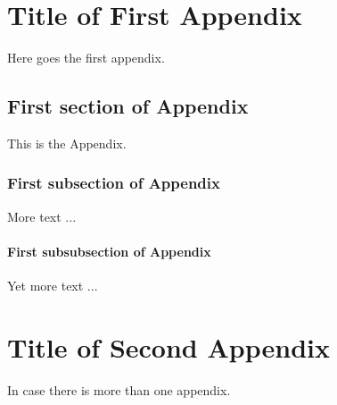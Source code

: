 \documentclass[12pt]{nuthesis}	%
\begin{document}
% 


\appendix		%


\chapter{Title of First Appendix} 	%

Here goes the first appendix.


\section{First section of Appendix}	%

This is the Appendix.

\subsection{First subsection of Appendix}  %

More text ...

\subsubsection{First subsubsection of Appendix}  %

Yet more text ...

\chapter{Title of Second Appendix}

In case there is more than one appendix.
\end{document}

